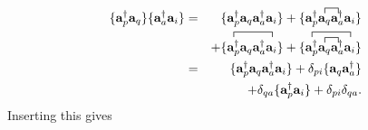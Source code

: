 \documentclass[a4paper,norsk,11pt,twoside]{report}
\begin{document}
\begin{align}
\{ \textbf{a}^{\dag}_p \textbf{a}_q\}  \{\textbf{a}^{\dag}_a \textbf{a}_i \} & = &
\{ \textbf{a}^{\dag}_p \textbf{a}_q \textbf{a}^{\dag}_a \textbf{a}_i \} + \{ \textbf{a}^{\dag}_p
\contraction{}{\textbf{a}_q}{}{\textbf{a}^{\dag}_a}
\textbf{a}_q \textbf{a}^{\dag}_a
\textbf{a}_i \}  \\ & &
+  \{
\contraction{}{\textbf{a}^{\dag}_p}{ \textbf{a}_q \textbf{a}^{\dag}_a}{\textbf{a}_i}
\textbf{a}^{\dag}_p \textbf{a}_q \textbf{a}^{\dag}_a \textbf{a}_i \} 
+ \{
\contraction{}{\textbf{a}^{\dag}_p}{\textbf{a}_q \textbf{a}^{\dag}_a}{\textbf{a}_i}
\contraction{\textbf{a}^{\dag}_p}{\textbf{a}_q}{} {\textbf{a}^{\dag}_a}
\textbf{a}^{\dag}_p \textbf{a}_q \textbf{a}^{\dag}_a \textbf{a}_i \} \nonumber \\ & = &
\{ \textbf{a}^{\dag}_p \textbf{a}_q \textbf{a}^{\dag}_a \textbf{a}_i \} + \delta_{pi} \{\textbf{a}_q \textbf{a}_a^{\dag} \} \nonumber \\ & &
+ \delta_{qa} \{\textbf{a}_p^{\dag} \textbf{a}_i \} 
+ \delta_{pi} \delta_{qa} . \nonumber
\end{align}
Inserting this gives 
\end{document}
